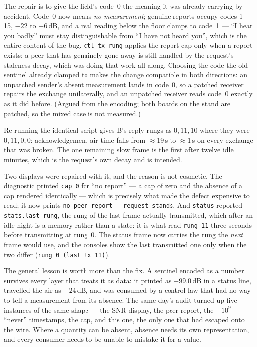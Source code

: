 The repair is to give the field's code~0 the meaning it was already
carrying by accident.  Code~0 now means \emph{no measurement};
genuine reports occupy codes 1--15, $-22$ to $+6$\,dB, and a real
reading below the floor clamps to code~1 --- ``I hear you badly'' must
stay distinguishable from ``I have not heard you'', which is the entire
content of the bug.  \texttt{ctl\_tx\_rung} applies the report cap only
when a report exists; a peer that has genuinely gone away is still
handled by the request's staleness decay, which was doing that work all
along.  Choosing the code the old sentinel already clamped to makes the
change compatible in both directions: an unpatched sender's absent
measurement lands in code~0, so a patched receiver repairs the exchange
unilaterally, and an unpatched receiver reads code~0 exactly as it did
before.  (Argued from the encoding; both boards on the stand are
patched, so the mixed case is not measured.)

Re-running the identical script gives B's reply rungs as
$0, 11, 10$ where they were $0, 11, 0, 0$: acknowledgement air time
falls from $\approx$19\,s to $\approx$1\,s on every exchange that was
broken.  The one remaining slow frame is the first after twelve idle
minutes, which is the request's own decay and is intended.

Two displays were repaired with it, and the reason is not cosmetic.
The diagnostic printed \texttt{cap 0} for ``no report'' --- a cap of
zero and the absence of a cap rendered identically --- which is
precisely what made the defect expensive to read; it now prints
\texttt{no peer report -- request stands}.  And \texttt{status}
reported \texttt{stats.last\_rung}, the rung of the last frame actually
transmitted, which after an idle night is a memory rather than a state:
it is what read \texttt{rung 11} three seconds before transmitting at
rung~0.  The status frame now carries the rung the \emph{next} frame
would use, and the consoles show the last transmitted one only when the
two differ (\texttt{rung 0 (last tx 11)}).

The general lesson is worth more than the fix.  A sentinel encoded as a
number survives every layer that treats it as data: it printed as
$-99.0$\,dB in a status line, travelled the air as $-24$\,dB, and was
consumed by a control law that had no way to tell a measurement from
its absence.  The same day's audit turned up five instances of the same
shape --- the SNR display, the peer report, the $-10^{9}$ ``never''
timestamps, the cap, and this one, the only one that had escaped onto
the wire.  Where a quantity can be absent, absence needs its own
representation, and every consumer needs to be unable to mistake it for
a value.

